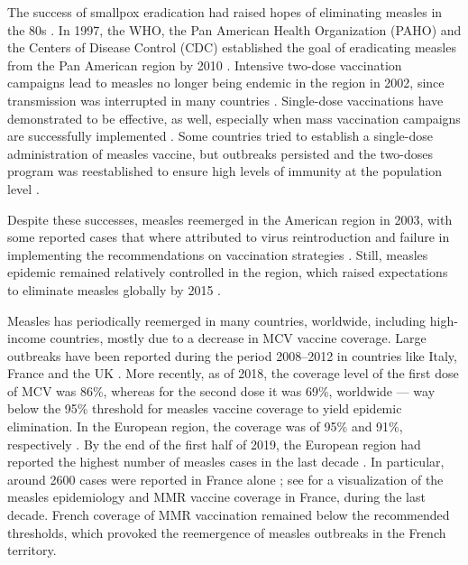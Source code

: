The success of smallpox eradication had raised hopes of eliminating measles in the 80s \cite[]{Hopkins1982}. In 1997, the WHO, the Pan American Health Organization (PAHO) and the Centers of Disease Control (CDC) established the goal of eradicating measles from the Pan American region by 2010 \cite[]{MMWR_MeaslesErradication1997}. Intensive two-dose vaccination campaigns lead to measles no longer being endemic in the region in 2002, since transmission was interrupted in many countries \cite[]{Sever2011,DeQuadros2004}. 
%
Single-dose vaccinations have demonstrated to be effective, as well, especially when mass vaccination campaigns are successfully implemented \cite[]{Sever2011}. Some countries tried to establish a single-dose administration of measles vaccine, but outbreaks persisted and the two-doses program was reestablished to ensure high levels of immunity at the population level \cite[]{Strebel2013}. 

Despite these successes, measles reemerged in the American region in 2003, with some reported cases that where attributed to virus reintroduction and failure in implementing the recommendations on vaccination strategies \cite[]{MMWR_MeaslesErradication1997,DeQuadros2004,Andrus2011}. Still, measles epidemic remained relatively controlled in the region, which raised expectations to eliminate measles globally by 2015 \cite[]{DeQuadros2004}. %

Measles has periodically reemerged in many countries, worldwide, including high-income countries, mostly due to a decrease in MCV vaccine coverage. 
Large outbreaks have been reported during the period 2008--2012 in countries like Italy, France and the UK \cite[]{Amendola2015,Antona2013,Keenan2017,Bechini2019}. More recently, as of 2018, the coverage level of the first dose of MCV was 86\%, whereas for the second dose it was 69\%, worldwide \cite[]{Peck2018} --- way below the 95\% threshold for measles vaccine coverage to yield epidemic elimination. In the European region, the coverage was of 95\% and 91\%, respectively \cite[]{Peck2018}. By the end of the first half of 2019, the European region had reported the highest number of measles cases in the last decade \cite[]{WHO_MeaslesEUR2018,ECDC_MR2019}. In particular, around 2600 cases were reported in France alone \cite[]{WHO_MeaslesFrance2020}; see  for a visualization of the measles epidemiology and MMR vaccine coverage in France, during the last decade. French coverage of MMR vaccination remained below the recommended thresholds, which provoked the reemergence of measles outbreaks in the French territory.

